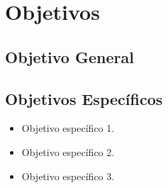 \section{Objetivos}
\subsection{Objetivo General}

\lipsum[2]
	
\subsection{Objetivos Específicos}
\begin{itemize}
\item Objetivo específico 1.

\item Objetivo específico 2.

\item Objetivo específico 3.

\end{itemize}





